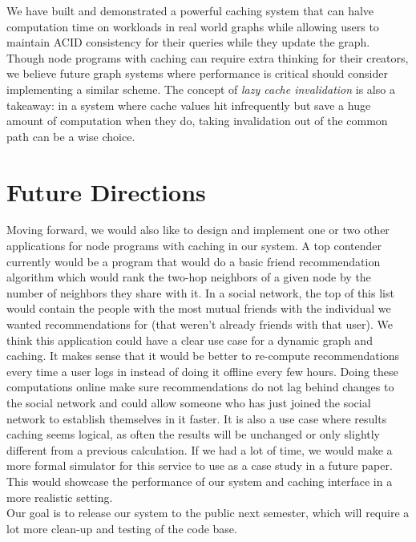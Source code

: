 \documentclass[letterpaper,twocolumn,11pt,tight]{article}
\begin{document}
We have built and demonstrated a powerful caching system that can halve computation time on workloads in real world graphs while allowing users to maintain ACID consistency for their queries while they update the graph. Though node programs with caching can require extra thinking for their creators, we believe future graph systems where performance is critical should consider implementing a similar scheme. The concept of \emph{lazy cache invalidation} is also a takeaway: in a system where cache values hit infrequently but save a huge amount of computation when they do, taking invalidation out of the common path can be a wise choice.

\section{Future Directions}\label{sec:future}
Moving forward, we would also like to design and implement one or two other applications for node programs with caching in our system.
A top contender currently would be a program that would do a basic friend recommendation algorithm which would rank the two-hop neighbors of a given node by the number of neighbors they share with it.
In a social network, the top of this list would contain the people with the most mutual friends with the individual we wanted recommendations for (that weren't already friends with that user).
We think this application could have a clear use case for a dynamic graph and caching. It makes sense that it would be better to re-compute recommendations every time a user logs in instead of doing it offline every few hours.
Doing these computations online make sure recommendations do not lag behind changes to the social network and could allow someone who has just joined the social network to establish themselves in it faster. It is also a use case where results caching seems logical, as often the results will be unchanged or only slightly different from a previous calculation.
 If we had a lot of time, we would make a more formal simulator for this service to use as a case study in a future paper. This would showcase the performance of our system and caching interface in a more realistic setting.
\\

Our goal is to release our system to the public next semester, which will require a lot more clean-up and testing of the code base.

\footnotesize

\end{document}
